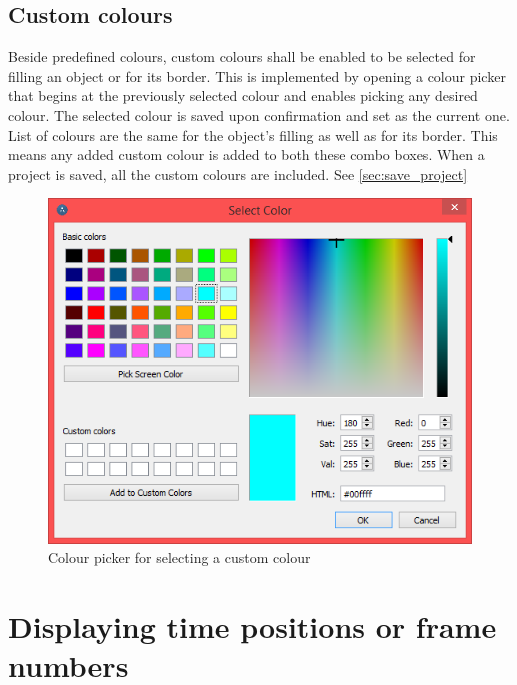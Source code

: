 \subsection{Custom colours}
Beside predefined colours, custom colours shall be enabled to be selected for filling an object or for its border. This is implemented by opening a colour picker that begins at the previously selected colour and enables picking any desired colour. The selected colour is saved upon confirmation and set as the current one. List of colours are the same for the object's filling as well as for its border. This means any added custom colour is added to both these combo boxes. When a project is saved, all the custom colours are included. See \autoref{sec:save_project}
\begin{figure}[!htbp]
\centering
\includegraphics[scale=0.6]{png/colour_picker}
\caption{Colour picker for selecting a custom colour}
\label{fig:colour_picker}
\end{figure}

\section{Displaying time positions or frame numbers}\label{sec:time_num}

